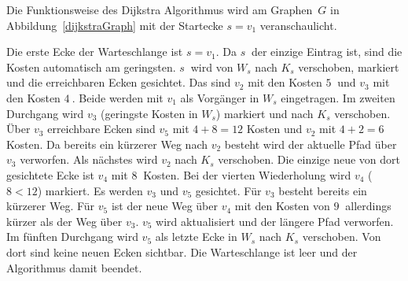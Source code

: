 Die Funktionsweise des Dijkstra Algorithmus wird am Graphen~$G$ in Abbildung~\ref{dijkstraGraph} mit der Startecke $s=v_{1}$ veranschaulicht.

Die erste Ecke der Warteschlange ist $s=v_{1}$.
Da $s~$ der einzige Eintrag ist, sind die Kosten automatisch am geringsten.
$s~$ wird von $W_{s}$ nach $K_{s}$ verschoben, markiert und die erreichbaren Ecken gesichtet.
Das sind $v_{2}$ mit den Kosten $5~$ und $v_{3}$ mit den Kosten $4~$.
Beide werden mit $v_{1}$ als Vorgänger in $W_{s}$ eingetragen.
Im zweiten Durchgang wird $v_{3}$ (geringste Kosten in $W_{s}$) markiert und nach $K_{s}$ verschoben.
Über $v_{3}$ erreichbare Ecken sind $v_{5}$ mit $4+8=12$ Kosten und $v_{2}$ mit $4+2=6$ Kosten.
Da bereits ein kürzerer Weg nach $v_{2}$ besteht wird der aktuelle Pfad über $v_{3}$ verworfen.
Als nächstes wird $v_{2}$ nach $K_{s}$ verschoben.
Die einzige neue von dort gesichtete Ecke ist $v_{4}$ mit $8~$ Kosten.
Bei der vierten Wiederholung wird $v_{4}$ ($8<12$) markiert.
Es werden $v_{3}$ und $v_{5}$ gesichtet.
Für $v_{3}$ besteht bereits ein kürzerer Weg.
Für $v_{5}$ ist der neue Weg über $v_{4}$ mit den Kosten von $9~$ allerdings kürzer als der Weg über $v_{3}$.
$v_{5}$ wird aktualisiert und der längere Pfad verworfen.
Im fünften Durchgang wird $v_{5}$ als letzte Ecke in $W_{s}$ nach $K_{s}$ verschoben.
Von dort sind keine neuen Ecken sichtbar.
Die Warteschlange ist leer und der Algorithmus damit beendet.

